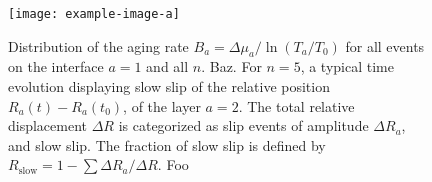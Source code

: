 \documentclass{article}
\begin{document}
\begin{figure}[htp]
    \subfloat{\label{fig:6a}}
    \subfloat{\label{fig:6b}}
    \subfloat{\label{fig:6c}}
    \subfloat{\label{fig:6d}}
    \centering
    \texttt{[image: example-image-a]}
    \protect\caption{
        \protect{}
        Distribution of the aging rate $B_a = \Delta \mu_a / \ln (T_a / T_0)$ for all events on the interface $a=1$ and all $n$.
        \protect{}
        Baz.
        \protect{}
        For $n=5$, a typical time evolution displaying slow slip of the relative position $R_a(t)-R_a(t_0)$, of the layer $a=2$.
        The total relative displacement $\Delta R$ is categorized as slip events of amplitude $\Delta R_a$, and slow slip.
        The fraction of slow slip is defined by $R_\mathrm{slow} = 1 - \sum \Delta R_a /\Delta R$.
        \protect{}
        Foo
    }
    \label{fig:6}
\end{figure}
\end{document}

